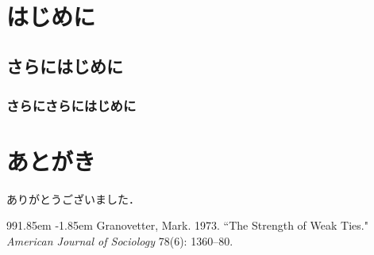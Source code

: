 \documentclass[a4paper,11pt,oneside,openany,uplatex]{jsbook}
\begin{document}
%
\frontmatter

\begin{abstract} %
\begin{center}
{\large 論文主旨}\\
\end{center}
これはこういうことについて書かれた論文です。
\end{abstract}

\tableofcontents　%

\mainmatter

\chapter{はじめに}
\section{さらにはじめに}
\subsection{さらにさらにはじめに}

 \backmatter
\chapter{あとがき}
ありがとうございました．

\def\bibindent{1.85em}
\begin{thebibliography}{99\kern\bibindent}
\makeatletter
\def\@biblabel#1{}
\let\old@bibitem\bibitem
\def\bibitem#1{\old@bibitem{#1}\leavevmode\kern-\bibindent}
\makeatother
\small
\bibitem{}
Granovetter, Mark. 1973. ``The Strength of Weak Ties." \textit{American Journal of Sociology} 78(6): 1360--80.
\end{thebibliography}
\end{document}
